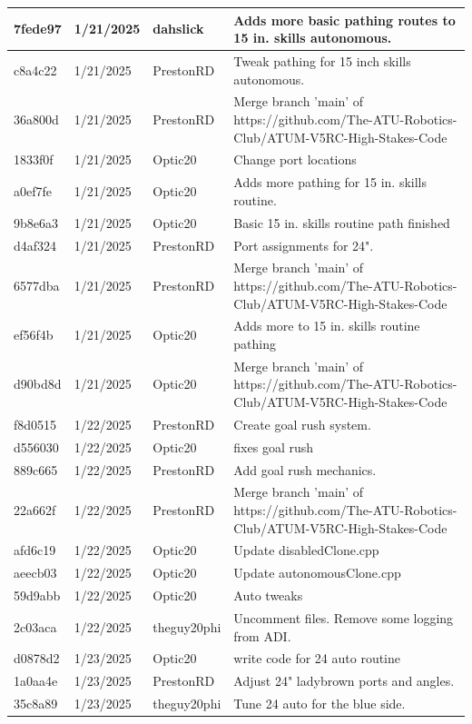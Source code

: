 \begin{center}
\begin{longtable}{|p{28pt}|p{33pt}|p{40pt}|p{300pt}|}
\hline
7fede97 & 1/21/2025 & dahslick & Adds more basic pathing routes to 15 in. skills autonomous. \\
\hline
c8a4c22 & 1/21/2025 & PrestonRD & Tweak pathing for 15 inch skills autonomous. \\
\hline
36a800d & 1/21/2025 & PrestonRD & Merge branch 'main' of https://github.com/The-ATU-Robotics-Club/ATUM-V5RC-High-Stakes-Code \\
\hline
1833f0f & 1/21/2025 & Optic20 & Change port locations \\
\hline
a0ef7fe & 1/21/2025 & Optic20 & Adds more pathing for 15 in. skills routine. \\
\hline
9b8e6a3 & 1/21/2025 & Optic20 & Basic 15 in. skills routine path finished \\
\hline
d4af324 & 1/21/2025 & PrestonRD & Port assignments for 24". \\
\hline
6577dba & 1/21/2025 & PrestonRD & Merge branch 'main' of https://github.com/The-ATU-Robotics-Club/ATUM-V5RC-High-Stakes-Code \\
\hline
ef56f4b & 1/21/2025 & Optic20 & Adds more to 15 in. skills routine pathing \\
\hline
d90bd8d & 1/21/2025 & Optic20 & Merge branch 'main' of https://github.com/The-ATU-Robotics-Club/ATUM-V5RC-High-Stakes-Code \\
\hline
f8d0515 & 1/22/2025 & PrestonRD & Create goal rush system. \\
\hline
d556030 & 1/22/2025 & Optic20 & fixes goal rush \\
\hline
889c665 & 1/22/2025 & PrestonRD & Add goal rush mechanics. \\
\hline
22a662f & 1/22/2025 & PrestonRD & Merge branch 'main' of https://github.com/The-ATU-Robotics-Club/ATUM-V5RC-High-Stakes-Code \\
\hline
afd6c19 & 1/22/2025 & Optic20 & Update disabledClone.cpp \\
\hline
aeecb03 & 1/22/2025 & Optic20 & Update autonomousClone.cpp \\
\hline
59d9abb & 1/22/2025 & Optic20 & Auto tweaks \\
\hline
2c03aca & 1/22/2025 & theguy20phi & Uncomment files. Remove some logging from ADI. \\
\hline
d0878d2 & 1/23/2025 & Optic20 & write code for 24 auto routine \\
\hline
1a0aa4e & 1/23/2025 & PrestonRD & Adjust 24" ladybrown ports and angles. \\
\hline
35c8a89 & 1/23/2025 & theguy20phi & Tune 24 auto for the blue side. \\

\end{longtable}
\end{center}

